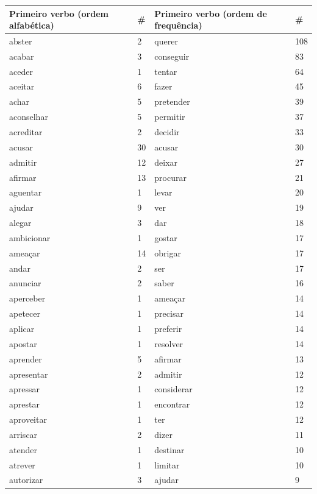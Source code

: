\documentclass[output=paper,colorlinks,citecolor=brown]{langscibook}
\begin{document}
		\begin{longtable}{ p{3cm} | p{1cm} | p{3cm} | p{1cm} }
			\hline
			\textbf{Primeiro verbo (ordem alfabética)} & \textbf{\#} & \textbf{Primeiro verbo (ordem de frequência)} & \textbf{\#} \\\hline
			abster & 2 & querer & 108\\\hline
			acabar & 3 & conseguir & 83\\\hline
			aceder & 1 & tentar & 64\\\hline
			aceitar & 6 & fazer & 45\\\hline
			achar & 5 & pretender & 39\\\hline
			aconselhar & 5 & permitir & 37\\\hline
			acreditar & 2 & decidir & 33\\\hline
			acusar & 30 & acusar & 30\\\hline
			admitir & 12 & deixar & 27\\\hline
			afirmar & 13 & procurar & 21\\\hline
			aguentar & 1 & levar & 20\\\hline
			ajudar & 9 & ver & 19\\\hline
			alegar & 3 & dar & 18\\\hline
			ambicionar & 1 & gostar & 17\\\hline
			ameaçar & 14 & obrigar & 17\\\hline
			andar & 2 & ser & 17\\\hline
			anunciar & 2 & saber & 16\\\hline
			aperceber & 1 & ameaçar & 14\\\hline
			apetecer & 1 & precisar & 14\\\hline
			aplicar & 1 & preferir & 14\\\hline
			apostar & 1 & resolver & 14\\\hline
			aprender & 5 & afirmar & 13\\\hline
			apresentar & 2 & admitir & 12\\\hline
			apressar & 1 & considerar & 12\\\hline
			aprestar & 1 & encontrar & 12\\\hline
			aproveitar & 1 & ter & 12\\\hline
			arriscar & 2 & dizer & 11\\\hline
			atender & 1 & destinar & 10\\\hline
			atrever & 1 & limitar & 10\\\hline
			autorizar & 3 & ajudar & 9\\\hline

\end{longtable}
\end{document}
